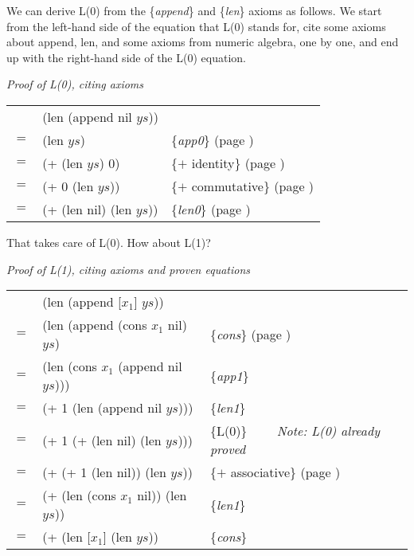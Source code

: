 We can derive L(0) from the \{\emph{append}\} and \{\emph{len}\} axioms as follows.
We start from the left-hand side of the equation that L(0) stands for,
cite some axioms about append, len, and some axioms from numeric algebra,
one by one, and end up with the right-hand side of the L(0) equation.

\begin{center}
\emph{Proof of L(0), citing axioms} \\
\begin{tabular}{lll}
    & (len (append nil $ys$))  &                                                \\
$=$ & (len $ys$)               & \{\emph{app0}\}     (page \pageref{append-equations})\\
$=$ & (+ (len $ys$) 0)         & \{$+$ identity\}    (page \pageref{fig-02-01}) \\
$=$ & (+ 0 (len $ys$))         & \{$+$ commutative\} (page \pageref{fig-02-01}) \\
$=$ & (+ (len nil) (len $ys$)) & \{\emph{len0}\}     (page \pageref{len-equations})
\end{tabular}
\end{center}

That takes care of L(0). How about L(1)?

\begin{center}
\emph{Proof of L(1), citing axioms and proven equations} \\
\begin{tabular}{lll}
    & (len (append [$x_1$] $ys$))           &                     \\
$=$ & (len (append (cons $x_1$ nil) $ys$)   & \{\emph{cons}\} (page \pageref{first-rest-cons}) \\
$=$ & (len (cons $x_1$ (append nil $ys$)))  & \{\emph{app1}\}     \\
$=$ & (+ 1 (len (append nil $ys$)))         & \{\emph{len1}\}     \\
$=$ & (+ 1 (+ (len nil) (len $ys$)))        & \{L(0)\} ~~~~\emph{Note: L(0) already proved}\\
$=$ & (+ (+ 1 (len nil)) (len $ys$))        & \{$+$ associative\} (page \pageref{fig-02-01}) \\
$=$ & (+ (len (cons $x_1$ nil)) (len $ys$)) & \{\emph{len1}\}     \\
$=$ & (+ (len [$x_1$] (len $ys$))           & \{\emph{cons}\}     \\
\end{tabular}
\end{center}

